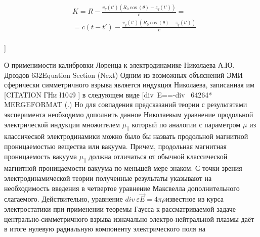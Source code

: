 \documentclass[11pt]{article}
\begin{document}
\begin{align}
  & K=R-\frac{{{v}_{q}}\left( t' \right)\left( {{R}_{0}}\cos \left( \theta  \right)-{{z}_{q}}\left( t' \right) \right)}{c}= \\ 
 & =c\left( t-t' \right)-\frac{{{v}_{q}}\left( t' \right)\left( {{R}_{0}}\cos \left( \theta  \right)-{{z}_{q}}\left( t' \right) \right)}{c} \\ 
\end{align}

{]}

О применимости калибровки Лоренца к электродинамике Николаева А.Ю.
Дроздов 632Equation Section (Next) Одним из возможных объяснений ЭМИ
сферически симметричного взрыва является индукция Николаева, записанная
им {[}CITATION ГНи \l 1049 {]} в следующем виде
{[}div~E==-div~\overrightarrow{{{A}_{H}}}{]}
64264* MERGEFORMAT (.) Но для совпадения предсказаний теории с
результатами эксперимента необходимо дополнить данное Николаевым
уравнение продольной электрической индукции множителем
\({{\mu }_{\parallel }}\) который по аналогии с параметром $\mu $ из
классической электродинамики можно было бы назвать продольной магнитной
проницаемостью вещества или вакуума. Причем, продольная магнитная
проницаемость вакуума \({{\mu }_{\parallel }}\) должна отличаться от
обычной классической магнитной проницаемости вакуума по меньшей мере
знаком. С точки зрения электродинамической теории полученные результаты
указывают на необходимость введения в четвертое уравнение Максвелла
дополнительного слагаемого. Действительно, уравнение
$div~\varepsilon \overrightarrow{E}=4\pi \rho $известное из курса
электростатики при применении теоремы Гаусса к рассматриваемой задаче
центрально-симметричного взрыва изначально электро-нейтральной плазмы
даёт в итоге нулевую радиальную компоненту электрического поля на
\end{document}
